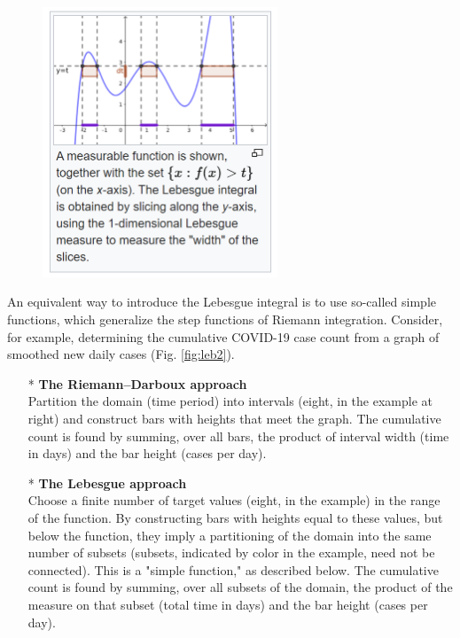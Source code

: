\begin{figure}[h]
    \centering
    \includegraphics[width=7cm]{img/leb1.png}
    \caption{}
    \label{fig:leb1}
\end{figure}
An equivalent way to introduce the Lebesgue integral is to use so-called simple functions, which generalize the step functions of Riemann integration. Consider, for example, determining the cumulative COVID-19 case count from a graph of smoothed new daily cases (Fig. \ref{fig:leb2}). 
\begin{itemize}
    \item[*]\textbf{The Riemann–Darboux approach}
    \\Partition the domain (time period) into intervals (eight, in the example at right) and construct bars with heights that meet the graph. The cumulative count is found by summing, over all bars, the product of interval width (time in days) and the bar height (cases per day).
    \item[*]\textbf{The Lebesgue approach}
    \\Choose a finite number of target values (eight, in the example) in the range of the function. By constructing bars with heights equal to these values, but below the function, they imply a partitioning of the domain into the same number of subsets (subsets, indicated by color in the example, need not be connected). This is a "simple function," as described below. The cumulative count is found by summing, over all subsets of the domain, the product of the measure on that subset (total time in days) and the bar height (cases per day).
\end{itemize}

